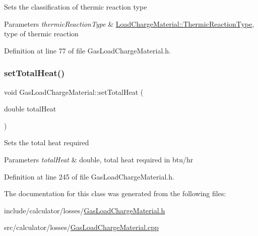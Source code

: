 Sets the classification of thermic reaction type 
\begin{DoxyParams}{Parameters}
{\em thermic\+Reaction\+Type} & \hyperlink{class_load_charge_material_a51d4263e865a5d86236622dd3fe23fd1}{Load\+Charge\+Material\+::\+Thermic\+Reaction\+Type}, type of thermic reaction \\
\hline
\end{DoxyParams}


Definition at line 77 of file Gas\+Load\+Charge\+Material.\+h.

\mbox{\label{class_gas_load_charge_material_aae01f6f4f923965c111e1dac66eb8365}} 
\subsubsection{\texorpdfstring{set\+Total\+Heat()}{setTotalHeat()}}
{\footnotesize\ttfamily void Gas\+Load\+Charge\+Material\+::set\+Total\+Heat (\begin{DoxyParamCaption}\item[{double}]{total\+Heat }\end{DoxyParamCaption})\hspace{0.3cm}{\ttfamily [inline]}}

Sets the total heat required 
\begin{DoxyParams}{Parameters}
{\em total\+Heat} & double, total heat required in btu/hr \\
\hline
\end{DoxyParams}


Definition at line 245 of file Gas\+Load\+Charge\+Material.\+h.



The documentation for this class was generated from the following files\+:\begin{DoxyCompactItemize}
\item 
include/calculator/losses/\hyperlink{_gas_load_charge_material_8h}{Gas\+Load\+Charge\+Material.\+h}\item 
src/calculator/losses/\hyperlink{_gas_load_charge_material_8cpp}{Gas\+Load\+Charge\+Material.\+cpp}\end{DoxyCompactItemize}
